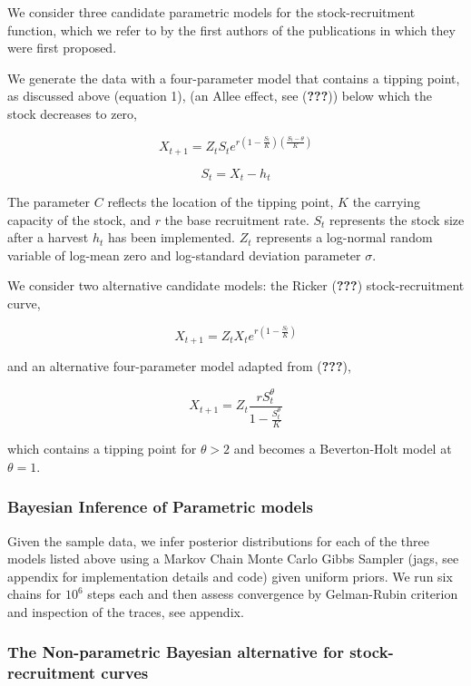 \documentclass[author-year, review]{elsarticle} %
\begin{document}
We consider three candidate parametric models for the stock-recruitment
function, which we refer to by the first authors of the publications in
which they were first proposed.

We generate the data with a four-parameter model that contains a tipping
point, as discussed above (equation 1), (an Allee effect, see
({\textbf{???}})) below which the stock decreases to zero,

\[ X_{t+1} = Z_t S_t e^{r \left(1 - \frac{S_t}{K}\right)\left(\frac{S_t - \theta}{K}\right)} \]

\[ S_t = X_t - h_t \]

The parameter $C$ reflects the location of the tipping point, $K$ the
carrying capacity of the stock, and $r$ the base recruitment rate. $S_t$
represents the stock size after a harvest $h_t$ has been implemented.
$Z_t$ represents a log-normal random variable of log-mean zero and
log-standard deviation parameter $\sigma$.

We consider two alternative candidate models: the Ricker
({\textbf{???}}) stock-recruitment curve,

\[X_{t+1} = Z_t X_t e^{r \left(1 - \frac{S_t}{K} \right) } \]

and an alternative four-parameter model adapted from ({\textbf{???}}),

\[ X_{t+1} = Z_t \frac{r S_t^{\theta}}{1 - \frac{S_t^\theta}{K}} \]

which contains a tipping point for $\theta > 2$ and becomes a
Beverton-Holt model at $\theta = 1$.

\subsubsection{Bayesian Inference of Parametric
models}\label{bayesian-inference-of-parametric-models}

Given the sample data, we infer posterior distributions for each of the
three models listed above using a Markov Chain Monte Carlo Gibbs Sampler
(jags, see appendix for implementation details and code) given uniform
priors. We run six chains for $10^6$ steps each and then assess
convergence by Gelman-Rubin criterion and inspection of the traces, see
appendix.

\subsubsection{The Non-parametric Bayesian alternative for
stock-recruitment
curves}\label{the-non-parametric-bayesian-alternative-for-stock-recruitment-curves}
\end{document}
